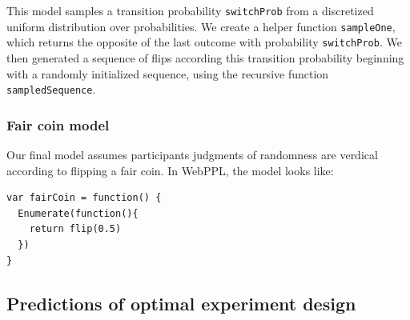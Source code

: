 \documentclass{article}
\begin{document}
This model samples a transition probability \lstinline{switchProb} from a discretized uniform distribution over probabilities.
We create a helper function \lstinline{sampleOne}, which returns the opposite of the last outcome with probability \lstinline{switchProb}.
We then generated a sequence of flips according this transition probability beginning with a randomly initialized sequence, using the recursive function \lstinline{sampledSequence}.

\subsubsection{Fair coin model}
\label{s:tutorial:sss:fair}

Our final model assumes participants judgments of randomness are verdical according to flipping a fair coin. In WebPPL, the model looks like:

\begin{lstlisting}[caption=Fair coin model,  label={lst:m_fair}]
var fairCoin = function() {
  Enumerate(function(){
    return flip(0.5)
  })
}
\end{lstlisting}

\subsection{Predictions of optimal experiment design}
\end{document}
